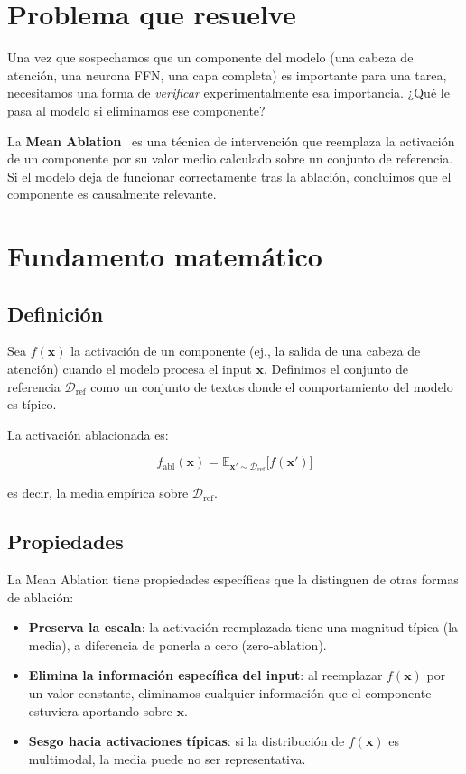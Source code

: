 \documentclass[11pt,a4paper]{report}
\theoremstyle{definition}
\begin{document}
\section{Problema que resuelve}

Una vez que sospechamos que un componente del modelo (una cabeza de atención, una neurona FFN, una capa completa) es importante para una tarea, necesitamos una forma de \emph{verificar} experimentalmente esa importancia. ¿Qué le pasa al modelo si eliminamos ese componente?

La \textbf{Mean Ablation}~\cite{wang2022ioi} es una técnica de intervención que reemplaza la activación de un componente por su valor medio calculado sobre un conjunto de referencia. Si el modelo deja de funcionar correctamente tras la ablación, concluimos que el componente es causalmente relevante.

\section{Fundamento matemático}

\subsection{Definición}

Sea $f(\mathbf{x})$ la activación de un componente (ej., la salida de una cabeza de atención) cuando el modelo procesa el input $\mathbf{x}$. Definimos el conjunto de referencia $\mathcal{D}_{\text{ref}}$ como un conjunto de textos donde el comportamiento del modelo es típico.

La activación ablacionada es:

\[
f_{\text{abl}}(\mathbf{x}) = \mathbb{E}_{\mathbf{x}' \sim \mathcal{D}_{\text{ref}}}\big[f(\mathbf{x}')\big]
\]

es decir, la media empírica sobre $\mathcal{D}_{\text{ref}}$.

\subsection{Propiedades}

La Mean Ablation tiene propiedades específicas que la distinguen de otras formas de ablación:

\begin{itemize}
    \item \textbf{Preserva la escala}: la activación reemplazada tiene una magnitud típica (la media), a diferencia de ponerla a cero (zero-ablation).
    \item \textbf{Elimina la información específica del input}: al reemplazar $f(\mathbf{x})$ por un valor constante, eliminamos cualquier información que el componente estuviera aportando sobre $\mathbf{x}$.
    \item \textbf{Sesgo hacia activaciones típicas}: si la distribución de $f(\mathbf{x})$ es multimodal, la media puede no ser representativa.
\end{itemize}
\end{document}
